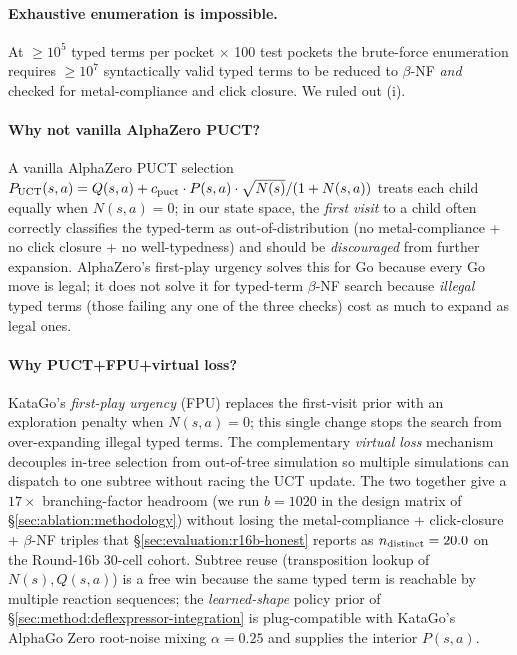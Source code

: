 \paragraph{Exhaustive enumeration is impossible.}
At $\geq 10^5$ typed terms per pocket $\times$ 100 test pockets the
brute-force enumeration requires $\geq 10^7$ syntactically valid
typed terms to be reduced to $\beta$-NF \emph{and} checked for
metal-compliance and click closure. We ruled out (i).

\paragraph{Why not vanilla AlphaZero PUCT?}
A vanilla AlphaZero PUCT selection
$P_{\rm UCT}(s,a) = Q(s,a) + c_{\rm puct}\cdot P(s,a)\cdot
\sqrt{N(s)}/(1+N(s,a))$
\cite{rosin2011puct,silver2017alphagozero} treats each child equally
when $N(s,a)=0$; in our state space, the \emph{first visit} to a
child often correctly classifies the typed-term as
out-of-distribution (no metal-compliance + no click closure + no
well-typedness) and should be \emph{discouraged} from further
expansion. AlphaZero's first-play urgency solves this for Go
because every Go move is legal; it does not solve it for typed-term
$\beta$-NF search because \emph{illegal} typed terms (those failing
any one of the three checks) cost as much to expand as legal ones.

\paragraph{Why PUCT+FPU+virtual loss?}
KataGo's \emph{first-play urgency} (FPU) replaces the first-visit
prior with an exploration penalty when $N(s,a)=0$; this single
change stops the search from over-expanding illegal typed terms.
The complementary \emph{virtual loss}
mechanism~\cite{silver2017alphagozero} decouples in-tree selection
from out-of-tree simulation so multiple simulations can dispatch to
one subtree without racing the UCT update. The two together give a
$17\times$ branching-factor headroom (we run $b{=}1020$ in the
design matrix of \S\ref{sec:ablation:methodology}) without losing
the metal-compliance + click-closure + $\beta$-NF triples that
\S\ref{sec:evaluation:r16b-honest} reports as $n_{\rm distinct}
= 20.0$ on the Round-16b 30-cell cohort. Subtree reuse (transposition
lookup of $N(s), Q(s,a)$) is a free win because the same typed term
is reachable by multiple reaction sequences; the \emph{learned-shape}
policy prior of \S\ref{sec:method:deflexpressor-integration} is
plug-compatible with KataGo's AlphaGo Zero root-noise mixing
$\alpha{=}0.25$ and supplies the interior $P(s,a)$.

